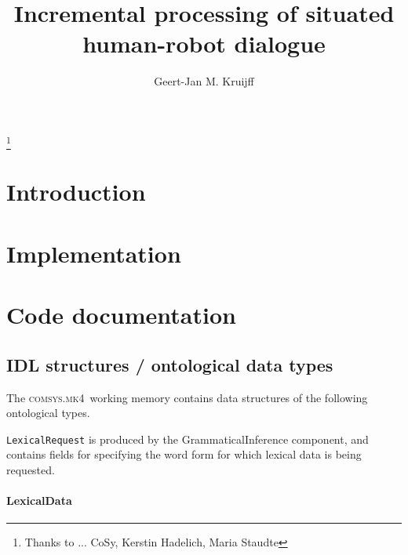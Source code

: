 \documentclass[onecolumn,11pt]{elsart}
\newcommand{\cmpn}[1]{\textsf{#1}}
\newcommand{\comsys}{\textsc{comsys.mk4}}
\newcommand{\data}[1]{\texttt{#1}}
\begin{document}
\begin{frontmatter}
\title{Incremental processing of situated human-robot dialogue }
\author{Geert-Jan M. Kruijff}
\address{DFKI GmbH, Saarbr\"ucken Germany\\ $\langle$\emph{\texttt{gj@dfki.de}}$\rangle$}
\thanks[cosy]{Thanks to ... CoSy, Kerstin Hadelich, Maria Staudte}



\end{frontmatter}



\section{Introduction}



\section{Implementation}



\appendix

\section{Code documentation}

\subsection{IDL structures / ontological data types}

The \comsys\ working memory contains data structures of the following ontological types.  

\data{LexicalRequest} is produced by the \cmpn{GrammaticalInference} component, and contains fields for specifying the word form for which lexical data is being requested.  

\paragraph{LexicalData}
\end{document}
